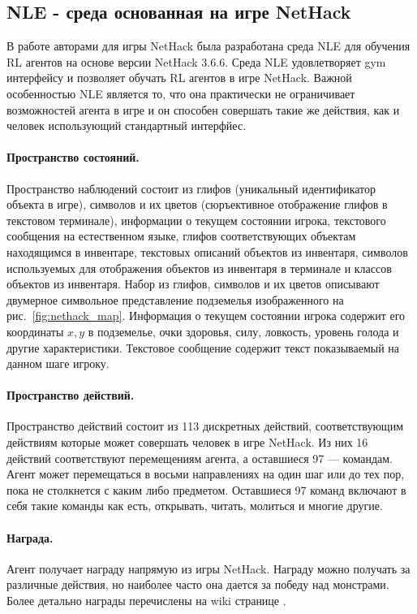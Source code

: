 \subsection{NLE - среда основанная на игре NetHack}
В работе \cite{nethack} авторами для игры NetHack была разработана среда NLE для обучения RL агентов на основе версии NetHack 3.6.6. Среда NLE удовлетворяет gym интерфейсу \cite{brockman2016openai} и позволяет обучать RL агентов в игре NetHack. Важной особенностью NLE является то, что она практически не ограничивает возможностей агента в игре и он способен совершать такие же действия, как и человек использующий стандартный интерфйес. 

\paragraph{Пространство состояний.}
Пространство наблюдений состоит из глифов (уникальный идентификатор объекта в игре), символов и их цветов (сюръективное отображение глифов в текстовом терминале),  информации о текущем состоянии игрока, текстового сообщения на естественном языке, глифов соответствующих объектам находящимся в инвентаре, текстовых описаний объектов из инвентаря, символов используемых для отображения объектов из инвентаря в терминале и классов объектов из инвентаря. Набор из глифов, символов и их цветов описывают двумерное символьное представление подземелья изображенного на рис.~\ref{fig:nethack_map}. Информация о текущем состоянии игрока содержит его координаты $x,y$ в подземелье,  очки здоровья, силу, ловкость, уровень голода и другие характеристики. Текстовое сообщение содержит текст показываемый на данном шаге игроку. 

\paragraph{Пространство действий.} Пространство действий состоит из 113 дискретных действий, соответствующим действиям которые может совершать человек в игре NetHack. Из них 16 действий соответствуют перемещениям агента, а оставшиеся 97 --- командам. Агент может перемещаться в восьми направлениях на один шаг или до тех пор, пока  не столкнется с каким либо предметом. Оставшиеся 97 команд включают в себя такие команды как есть, открывать, читать, молиться и многие другие.

\paragraph{Награда.}
Агент получает награду напрямую из игры NetHack. Награду можно получать за различные действия, но наиболее часто она дается за победу над монстрами. Более детально награды перечислены на wiki странице \cite{nethack_wiki}. 

